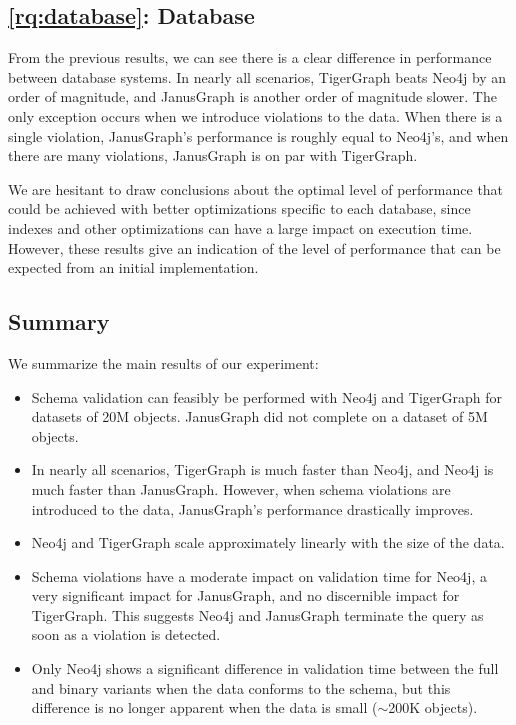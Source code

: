 \documentclass{report}
\theoremstyle{definition}
\begin{document}
\subsection{\ref*{rq:database}: Database}

From the previous results, we can see there is a clear difference in performance between database systems. In nearly all scenarios, TigerGraph beats Neo4j by an order of magnitude, and JanusGraph is another order of magnitude slower. The only exception occurs when we introduce violations to the data. When there is a single violation, JanusGraph's performance is roughly equal to Neo4j's, and when there are many violations, JanusGraph is on par with TigerGraph.

We are hesitant to draw conclusions about the optimal level of performance that could be achieved with better optimizations specific to each database, since indexes and other optimizations can have a large impact on execution time. However, these results give an indication of the level of performance that can be expected from an initial implementation.

\subsection{Summary}

We summarize the main results of our experiment:

\begin{itemize}
  \item Schema validation can feasibly be performed with Neo4j and TigerGraph for datasets of 20M objects. JanusGraph did not complete on a dataset of 5M objects.
  \item In nearly all scenarios, TigerGraph is much faster than Neo4j, and Neo4j is much faster than JanusGraph. However, when schema violations are introduced to the data, JanusGraph's performance drastically improves.
  \item Neo4j and TigerGraph scale approximately linearly with the size of the data.
  \item Schema violations have a moderate impact on validation time for Neo4j, a very significant impact for JanusGraph, and no discernible impact for TigerGraph. This suggests Neo4j and JanusGraph terminate the query as soon as a violation is detected.
  \item Only Neo4j shows a significant difference in validation time between the full and binary variants when the data conforms to the schema, but this difference is no longer apparent when the data is small ($\sim$200K objects).
\end{itemize}
\end{document}

